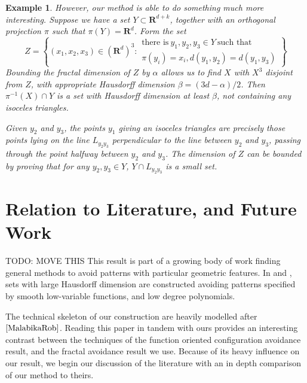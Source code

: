 \documentclass[usenames,dvipsnames]{article}
\theoremstyle{plain}
\newtheorem*{example}{Example}
\theoremstyle{plain}
\begin{document}
\begin{example}
	However, our method is able to do something much more interesting. Suppose we have a set $Y \subset \mathbf{R}^{d + k}$, together with an orthogonal projection $\pi$ such that $\pi(Y) = \mathbf{R}^d$. Form the set
	\[ Z = \left\{ (x_1,x_2,x_3) \in (\mathbf{R}^d)^3 : \begin{array}{l} \text{there is}\ y_1,y_2,y_3 \in Y\ \text{such that} \\
	\pi(y_i) = x_i, d(y_1,y_2) = d(y_1,y_3) \end{array} \right\} \]
	Bounding the fractal dimension of $Z$ by $\alpha$ allows us to find $X$ with $X^3$ disjoint from $Z$, with appropriate Hausdorff dimension $\beta = (3d - \alpha)/2$. Then $\pi^{-1}(X) \cap Y$ is a set with Hausdorff dimension at least $\beta$, not containing any isoceles triangles.

	Given $y_2$ and $y_3$, the points $y_1$ giving an isoceles triangles are precisely those points lying on the line $L_{y_2 y_3}$ perpendicular to the line between $y_2$ and $y_3$, passing through the point halfway between $y_2$ and $y_3$. The dimension of $Z$ can be bounded by proving that for any $y_2, y_3 \in Y$, $Y \cap L_{y_2 y_3}$ is a small set. 
\end{example}

\section{Relation to Literature, and Future Work}

TODO: MOVE THIS
This result is part of a growing body of work finding general methods to avoid patterns with particular geometric features. In \cite{MalabikaRob} and \cite{Mathe}, sets with large Hausdorff dimension are constructed avoiding patterns specified by smooth low-variable functions, and low degree polynomials.

The technical skeleton of our construction are heavily modelled after $\cite{MalabikaRob}$. Reading this paper in tandem with ours provides an interesting contrast between the techniques of the function oriented configuration avoidance result, and the fractal avoidance result we use. Because of its heavy influence on our result, we begin our discussion of the literature with an in depth comparison of our method to theirs.
\end{document}
